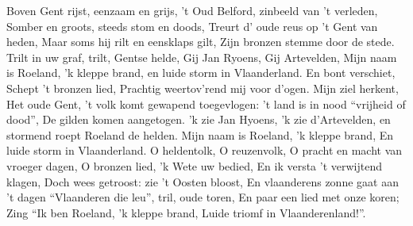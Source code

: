 \beginverse*
Boven Gent rijst, eenzaam en grijs,
't Oud Belford, zinbeeld van 't verleden,
Somber en groots, steeds stom en doods,
Treurt d’ oude reus op 't Gent van heden,
Maar soms hij rilt en eensklaps gilt,
Zijn bronzen stemme door de stede.
Trilt in uw graf, trilt, Gentse helde,
Gij Jan Ryoens, Gij Artevelden,
Mijn naam is Roeland, 'k kleppe brand,
en luide storm in Vlaanderland.
\endverse
\beginverse*
En bont verschiet, Schept 't bronzen lied,
Prachtig weertov’rend mij voor d’ogen.
Mijn ziel herkent, Het oude Gent,
't volk komt gewapend toegevlogen:
't land is in nood “vrijheid of dood”,
De gilden komen aangetogen.
'k zie Jan Hyoens, 'k zie d’Artevelden,
en stormend roept Roeland de helden.
Mijn naam is Roeland, 'k kleppe brand,
En luide storm in Vlaanderland.
\endverse
\beginverse*
O heldentolk, O reuzenvolk,
O pracht en macht van vroeger dagen,
O bronzen lied, 'k Wete uw bedied,
En ik versta 't verwijtend klagen,
Doch wees getroost: zie 't Oosten bloost,
En vlaanderens zonne gaat aan 't dagen
“Vlaanderen die leu”, tril, oude toren,
En paar een lied met onze koren;
Zing “Ik ben Roeland, 'k kleppe brand,
Luide triomf in Vlaanderenland!”.
\endverse
\endsong